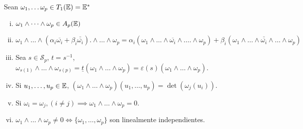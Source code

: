 \begin{prop} \label{prop_pr_ext}
    Sean $\omega_1, \dots \omega_p \in T_1(\mathbb{E}) = \mathbb{E}^*$
    \begin{enumerate}[i)]
        \item $\omega_1 \wedge \dots \wedge \omega_p \in A_p(\mathbb{E})$
        \item \label{prop_pr_ext_ii} $\omega_1 \wedge \dots \wedge \left(\alpha_i \overline{\omega_i} + \beta_i \overline{\overline{\omega_i}} \right).
        \wedge \dots \wedge \omega_p = \alpha_i (\omega_1 \wedge \dots \wedge \overline{\omega_i} \wedge \dots.
        \wedge \omega_p) + \beta_i (\omega_1 \wedge \dots \wedge \overline{\overline{\omega_i}} \wedge \dots
        \wedge \omega_p)$
        \item \label{prop_pr_ext_iii} Sea $s \in \mathcal{S}_p$, $t = s^{-1}$, $\omega_{s(1)} \wedge \dots \wedge \omega_{s(p)} =
        \underline{t}\left(\omega_1 \wedge \dots \wedge \omega_p \right) = \varepsilon(s)\left( \omega_1
        \wedge \dots \wedge \omega_p \right)$.
        \item \label{prop_pr_ext_iv} Si $u_1, \dots, u_p \in \mathbb{E}$, $\left( \omega_1 \wedge \dots \wedge \omega_p\right) \left(u_1, \dots,
        u_p\right) = \det\left(\omega_j(u_i)\right)$.
        \item \label{prop_pr_ext_v} Si $\omega_i = \omega_j , (i \neq j) \implies \omega_1 \wedge \dots \wedge \omega_p = 0$.
        \item $\omega_1 \wedge \dots \wedge \omega_p \neq 0 \iff \{\omega_1,\dots,\omega_p\}$ son linealmente independientes.
    \end{enumerate}
\end{prop}
